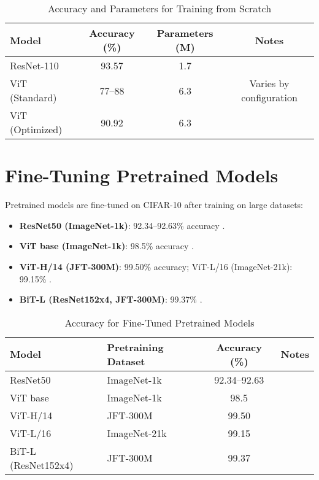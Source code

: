 \documentclass[UTF8]{report}
\theoremstyle{MyLineTheoremStyle} %
\theoremstyle{MyBlockTheoremStyle} %
\theoremstyle{MySubsubsectionStyle} %
\begin{document}
\begin{table}[h]
\centering
\caption{Accuracy and Parameters for Training from Scratch}
\begin{tabular}{lccc}
\toprule
Model & Accuracy (\%) & Parameters (M) & Notes \\
\midrule
ResNet-110 & 93.57 & 1.7 & \cite{he2016deep} \\
ViT (Standard) & 77–88 & 6.3 & Varies by configuration \cite{kentaroy47vit} \\
ViT (Optimized) & 90.92 & 6.3 & \cite{omihub777vitcifar} \\
\bottomrule
\end{tabular}
\end{table}

\section*{Fine-Tuning Pretrained Models}
Pretrained models are fine-tuned on CIFAR-10 after training on large datasets:
\begin{itemize}
    \item \textbf{ResNet50 (ImageNet-1k)}: 92.34–92.63\% accuracy \cite{sidthoviti}.
    \item \textbf{ViT base (ImageNet-1k)}: 98.5\% accuracy \cite{kentaroy47vit}.
    \item \textbf{ViT-H/14 (JFT-300M)}: 99.50\% accuracy; ViT-L/16 (ImageNet-21k): 99.15\% \cite{dosovitskiy2020image}.
    \item \textbf{BiT-L (ResNet152x4, JFT-300M)}: 99.37\% \cite{dosovitskiy2020image}.
\end{itemize}

\begin{table}[h]
\centering
\caption{Accuracy for Fine-Tuned Pretrained Models}
\begin{tabular}{llcc}
\toprule
Model & Pretraining Dataset & Accuracy (\%) & Notes \\
\midrule
ResNet50 & ImageNet-1k & 92.34–92.63 & \cite{sidthoviti} \\
ViT base & ImageNet-1k & 98.5 & \cite{kentaroy47vit} \\
ViT-H/14 & JFT-300M & 99.50 & \cite{dosovitskiy2020image} \\
ViT-L/16 & ImageNet-21k & 99.15 & \cite{dosovitskiy2020image} \\
BiT-L (ResNet152x4) & JFT-300M & 99.37 & \cite{dosovitskiy2020image} \\
\bottomrule
\end{tabular}
\end{table}
\end{document}
